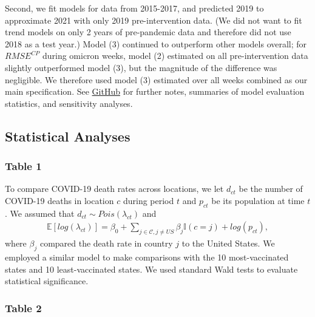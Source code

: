 \documentclass[
]{article}
\begin{document}
Second, we fit models for data from 2015-2017, and predicted 2019 to
approximate 2021 with only 2019 pre-intervention data. (We did not want
to fit trend models on only 2 years of pre-pandemic data and therefore
did not use 2018 as a test year.) Model (3) continued to outperform
other models overall; for \(RMSE^{CP}\) during omicron weeks, model (2)
estimated on all pre-intervention data slightly outperformed model (3),
but the magnitude of the difference was negligible. We therefore used
model (3) estimated over all weeks combined as our main specification.
See
\href{https://github.com/abilinski/ExcessMortalityDeltaOmicron}{GitHub}
for further notes, summaries of model evaluation statistics, and
sensitivity analyses.

\bigskip

\hypertarget{statistical-analyses}{%
\subsection{Statistical Analyses}\label{statistical-analyses}}

\hypertarget{table-1}{%
\subsubsection{Table 1}\label{table-1}}

To compare COVID-19 death rates across locations, we let \(d_{ct}\) be
the number of COVID-19 deaths in location \(c\) during period \(t\) and
\(p_{ct}\) be its population at time \(t\). We assumed that
\(d_{ct} \sim Pois(\lambda_{ct})\) and \begin{align*}
\mathbb{E}\left[log(\lambda_{ct})\right] = \beta_0 +  \sum_{j \in \mathcal{C}, j \neq US} \beta_j \mathbb{I}\left(c = j\right) + log(p_{ct}),
\end{align*} where \(\beta_j\) compared the death rate in country \(j\)
to the United States. We employed a similar model to make comparisons
with the 10 most-vaccinated states and 10 least-vaccinated states. We
used standard Wald tests to evaluate statistical significance.

\bigskip

\hypertarget{table-2}{%
\subsubsection{Table 2}\label{table-2}}
\end{document}
